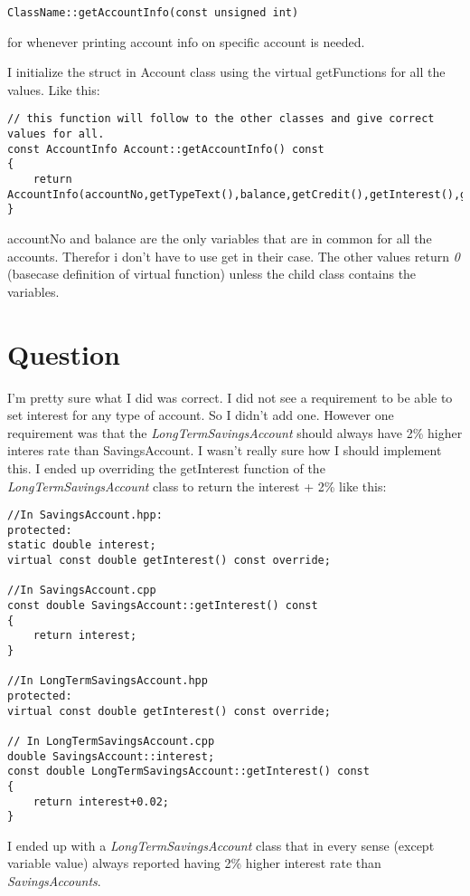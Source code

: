 \documentclass[11pt]{article}
\begin{document}
\begin{lstlisting}
ClassName::getAccountInfo(const unsigned int)
\end{lstlisting}
for whenever printing account info on specific account is needed.


I initialize the struct in Account class using the virtual getFunctions for all the values. Like this:

\begin{lstlisting}
// this function will follow to the other classes and give correct values for all.
const AccountInfo Account::getAccountInfo() const 
{
	return AccountInfo(accountNo,getTypeText(),balance,getCredit(),getInterest(),getUsableBalance());
} 	
\end{lstlisting}
accountNo and balance are the only variables that are in common for all the accounts. Therefor i don't have to use get in their case. The other values return \emph{0} (basecase definition of virtual function) unless the child class contains the variables.

\section{Question}

I'm pretty sure what I did was correct. I did not see a requirement to be able to set interest for any type of account. So I didn't add one. However one requirement was that the \emph{LongTermSavingsAccount} should always have 2\% higher interes rate than SavingsAccount. I wasn't really sure how I should implement this. I ended up overriding the getInterest function of the \emph{LongTermSavingsAccount} class to return the interest + 2\% like this:
\begin{lstlisting}
//In SavingsAccount.hpp:
protected:
static double interest;
virtual const double getInterest() const override;

//In SavingsAccount.cpp
const double SavingsAccount::getInterest() const
{
	return interest;
}

//In LongTermSavingsAccount.hpp
protected:
virtual const double getInterest() const override;

// In LongTermSavingsAccount.cpp
double SavingsAccount::interest;
const double LongTermSavingsAccount::getInterest() const
{
	return interest+0.02;
}
\end{lstlisting}

I ended up with a \emph{LongTermSavingsAccount} class that in every sense (except variable value) always reported having 2\% higher interest rate than \emph{SavingsAccounts}.
\end{document}
